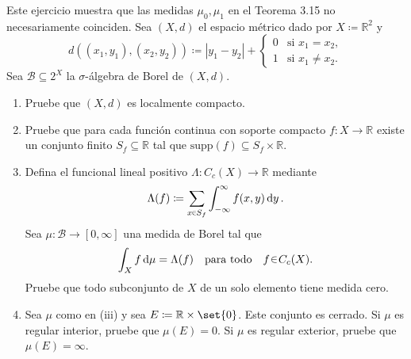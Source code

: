 
\setcounter{neje}{22}
\begin{nejer}
Este ejercicio muestra que las medidas $\mu_0, \mu_1$ en el Teorema 3.15 no necesariamente coinciden. Sea $(X, d)$ el espacio métrico dado por $X \coloneq \mathbb{R}^2$ y
$$
d((x_1, y_1), (x_2, y_2)) \coloneq |y_1 - y_2| + \begin{cases} 0 & \text{si } x_1 = x_2, \\ 1 & \text{si } x_1 \neq x_2. \end{cases}
$$
Sea $\mathcal{B} \subseteq 2^X$ la $\sigma$-álgebra de Borel de $(X, d)$.
\begin{enumerate}[label = (\roman*), leftmargin=1.5em]
\item Pruebe que $(X, d)$ es localmente compacto.
\item Pruebe que para cada función continua con soporte compacto $f \colon X \to \mathbb{R}$ existe un conjunto finito $S_f \subseteq \mathbb{R}$ tal que $\text{supp}(f) \subseteq S_f \times \mathbb{R}$.
\item Defina el funcional lineal positivo $\Lambda \colon C_c(X) \to \mathbb{R}$ mediante
$$
\Lambda(f) \coloneq \sum_{x \en S_f} \int_{-\infty}^\infty f(x, y) \dd{y}.
$$
Sea $\mu \colon \mathcal{B} \to [0, \infty]$ una medida de Borel tal que
$$
\int_X f \dd{\mu} = \Lambda(f) \quad \text{para todo} \quad f \en C_c(X).
$$
Pruebe que todo subconjunto de $X$ de un solo elemento tiene medida cero.
\item Sea $\mu$ como en (iii) y sea $E \coloneq \mathbb{R} \times \set{0}$. Este conjunto es cerrado. Si $\mu$ es regular interior, pruebe que $\mu(E) = 0$. Si $\mu$ es regular exterior, pruebe que $\mu(E) = \infty$.
\end{enumerate}
\end{nejer}
